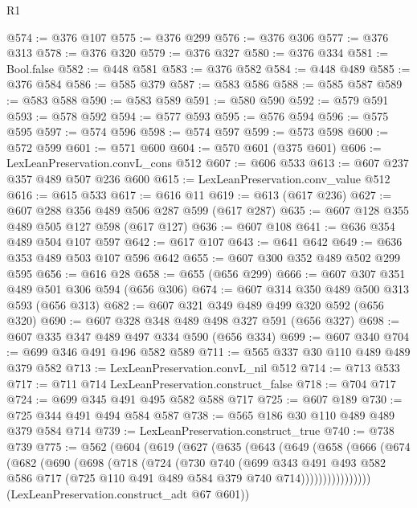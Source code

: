 \begin{lexlean}{R1}
\begin{coremodule}
@574 := @376 @107
@575 := @376 @299
@576 := @376 @306
@577 := @376 @313
@578 := @376 @320
@579 := @376 @327
@580 := @376 @334
@581 := Bool.false
@582 := @448 @581
@583 := @376 @582
@584 := @448 @489
@585 := @376 @584
@586 := @585 @379
@587 := @583 @586
@588 := @585 @587
@589 := @583 @588
@590 := @583 @589
@591 := @580 @590
@592 := @579 @591
@593 := @578 @592
@594 := @577 @593
@595 := @576 @594
@596 := @575 @595
@597 := @574 @596
@598 := @574 @597
@599 := @573 @598
@600 := @572 @599
@601 := @571 @600
@604 := @570 @601 (@375 @601)
@606 := LexLeanPreservation.convL_cons @512
@607 := @606 @533
@613 := @607 @237 @357 @489 @507 @236 @600
@615 := LexLeanPreservation.conv_value @512
@616 := @615 @533
@617 := @616 @11
@619 := @613 (@617 @236)
@627 := @607 @288 @356 @489 @506 @287 @599 (@617 @287)
@635 := @607 @128 @355 @489 @505 @127 @598 (@617 @127)
@636 := @607 @108
@641 := @636 @354 @489 @504 @107 @597
@642 := @617 @107
@643 := @641 @642
@649 := @636 @353 @489 @503 @107 @596 @642
@655 := @607 @300 @352 @489 @502 @299 @595
@656 := @616 @28
@658 := @655 (@656 @299)
@666 := @607 @307 @351 @489 @501 @306 @594 (@656 @306)
@674 := @607 @314 @350 @489 @500 @313 @593 (@656 @313)
@682 := @607 @321 @349 @489 @499 @320 @592 (@656 @320)
@690 := @607 @328 @348 @489 @498 @327 @591 (@656 @327)
@698 := @607 @335 @347 @489 @497 @334 @590 (@656 @334)
@699 := @607 @340
@704 := @699 @346 @491 @496 @582 @589
@711 := @565 @337 @30 @110 @489 @489 @379 @582
@713 := LexLeanPreservation.convL_nil @512
@714 := @713 @533
@717 := @711 @714 LexLeanPreservation.construct_false
@718 := @704 @717
@724 := @699 @345 @491 @495 @582 @588 @717
@725 := @607 @189
@730 := @725 @344 @491 @494 @584 @587
@738 := @565 @186 @30 @110 @489 @489 @379 @584 @714
@739 := LexLeanPreservation.construct_true
@740 := @738 @739
@775 := @562
    (@604
      (@619
        (@627
          (@635
            (@643
              (@649
                (@658
                  (@666
                    (@674
                      (@682
                        (@690
                          (@698
                            (@718
                              (@724
                                (@730
                                  @740
                                  (@699
                                    @343
                                    @491
                                    @493
                                    @582
                                    @586
                                    @717
                                    (@725 @110 @491 @489 @584 @379 @740 @714))))))))))))))))
      (LexLeanPreservation.construct_adt @67 @601))

\end{coremodule}
\end{lexlean}
